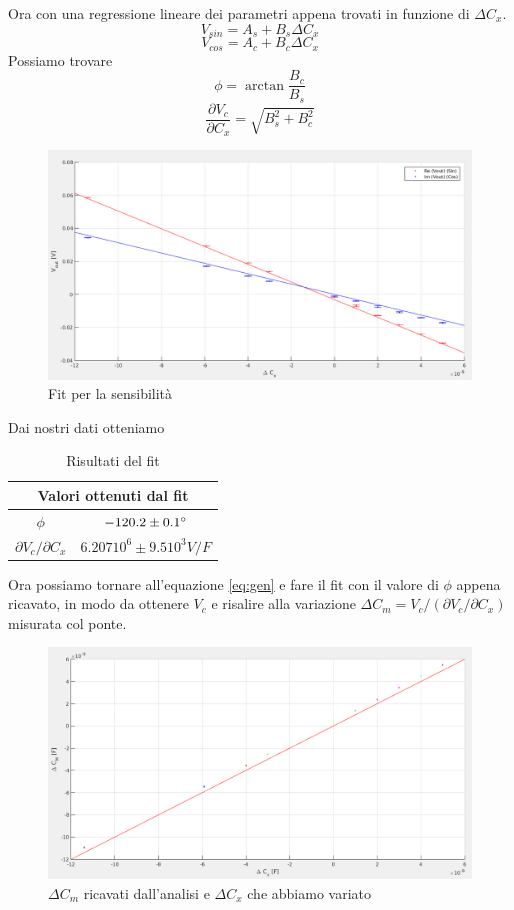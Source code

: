 \documentclass[12pt,]{article}
\begin{document}
Ora con una regressione lineare dei parametri appena trovati in funzione di $ \Delta C_x$.
$$V_{sin}= A_s + B_s \Delta{C_x}$$
$$V_{cos} = A_c + B_c \Delta{C_x}$$
Possiamo trovare 
\begin{equation}
\phi = \arctan{\frac{B_c}{B_s}}
\end{equation}
\begin{equation}
\frac{\partial{V_{c}}}{\partial{C_x}} = \sqrt{B_s^2 + B_c^2}
\end{equation}
\begin{figure}[H]
\centering
\includegraphics[width=\textwidth]{fitsensibilita}
\caption{Fit per la sensibilità}
\end{figure}
Dai nostri dati otteniamo
\begin{table}[H]
\centering
\begin{tabular}{c|c}
\toprule
\multicolumn{2}{c}{Valori ottenuti dal fit}\\
\midrule
\rowcolor{black!20}$\phi$ & $-120.2 \pm 0.1 \degree$ \\
$\partial V_{c}/\partial C_x $ & $ 6.207 10^{6}\pm 9.5 10^{3} V/F $ \\
\bottomrule
\end{tabular}
\caption{Risultati del fit}
\end{table}
Ora possiamo tornare all'equazione \eqref{eq:gen} e fare il fit con il valore di $\phi$ appena ricavato, in modo da ottenere $V_c$ e risalire alla variazione $\Delta C_m = V_c/(\partial V_{c}/\partial{C_x})$ misurata col ponte.
\begin{figure}[H]
\centering
\includegraphics[width=\textwidth]{deltacm}
\caption{$\Delta C_m$ ricavati dall'analisi e $\Delta C_x$ che abbiamo variato}
\end{figure}
\end{document}
